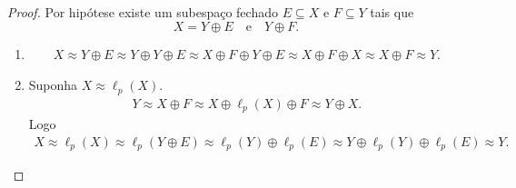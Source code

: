 \documentclass[portuguese]{article}
\theoremstyle{definition}
\begin{document}
\begin{proof}
	Por hipótese existe um subespaço fechado $E\subseteq X$ e $F\subseteq Y$ tais que
	\[X=Y\oplus E\quad\text{e}\quad Y\oplus F.\]
	\begin{enumerate}
		\item \begin{align*}
			X\approx Y\oplus E\approx Y\oplus Y\oplus E\approx X\oplus F\oplus Y\oplus E\approx X\oplus F\oplus X\approx X\oplus F\approx Y.
		\end{align*}
		
		\item Suponha $X\approx\ell_p(X)$.
		\begin{align*}
			Y\approx X\oplus F\approx X\oplus\ell_p(X)\oplus F\approx Y\oplus X.
		\end{align*}
		Logo
		\begin{align*}
			X\approx\ell_p(X)\approx\ell_p(Y\oplus E)\approx\ell_p(Y)\oplus\ell_p(E)\approx Y\oplus\ell_p(Y)\oplus\ell_p(E)\approx Y.
		\end{align*}
	\end{enumerate}
\end{proof}
\end{document}

